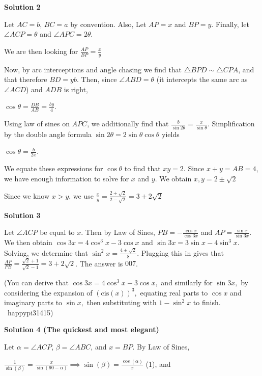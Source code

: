 \begin{enumerate}
\textbf{Solution 2}

Let $AC=b$, $BC=a$ by convention. Also, Let $AP=x$ and $BP=y$.  Finally, let $\angle ACP=\theta$ and $\angle APC=2\theta$. 

 We are then looking for $\frac{AP}{BP}=\frac{x}{y}$

 Now, by arc interceptions and angle chasing we find that $\triangle BPD \sim \triangle CPA$, and that therefore $BD=yb.$  Then, since $\angle ABD=\theta$ (it intercepts the same arc as $\angle ACD$) and $ADB$ is right, 

 $\cos\theta=\frac{DB}{AB}=\frac{by}{4}$.  

 
Using law of sines on $APC$, we additionally find that $\frac{b}{\sin 2\theta}=\frac{x}{\sin\theta}.$ Simplification by the double angle formula $\sin 2\theta=2\sin \theta\cos\theta$ yields 

 $\cos \theta=\frac{b}{2x}$.

 
We equate these expressions for $\cos\theta$ to find that $xy=2$. Since $x+y=AB=4$, we have enough information to solve for $x$ and $y$.  We obtain $x,y=2 \pm \sqrt{2}$ 

 Since we know $x>y$, we use $\frac{x}{y}=\frac{2+\sqrt{2}}{2-\sqrt{2}}=3+2\sqrt{2}$




\textbf{Solution 3}

Let $\angle{ACP}$ be equal to $x$. Then by Law of Sines, $PB = -\frac{\cos{x}}{\cos{3x}}$ and $AP = \frac{\sin{x}}{\sin{3x}}$. We then obtain $\cos{3x} = 4\cos^3{x} - 3\cos{x}$ and $\sin{3x} = 3\sin{x} - 4\sin^3{x}$. Solving, we determine that $\sin^2{x} = \frac{4 \pm \sqrt{2}}{8}$. Plugging this in gives that $\frac{AP}{PB} = \frac{\sqrt{2}+1}{\sqrt{2}-1} = 3 + 2\sqrt{2}$. The answer is $\boxed{007}$.

 
(You can derive that $\cos{3x} = 4\cos^3{x} - 3\cos{x},$ and similarly for $\sin{3x},$ by considering the expansion of $(\text{cis}(x))^3,$ equating real parts to $\cos{x}$ and imaginary parts to $\sin{x},$ then substituting with $1-\sin^2{x}$ to finish. ~happypi31415)

 



\textbf{Solution 4 (The quickest and most elegant)}

Let $\alpha=\angle{ACP}$, $\beta=\angle{ABC}$, and $x=BP$. By Law of Sines, 

 $\frac{1}{\sin(\beta)}=\frac{x}{\sin(90-\alpha)}\implies \sin(\beta)=\frac{\cos(\alpha)}{x}$ (1), and


\end{enumerate}
